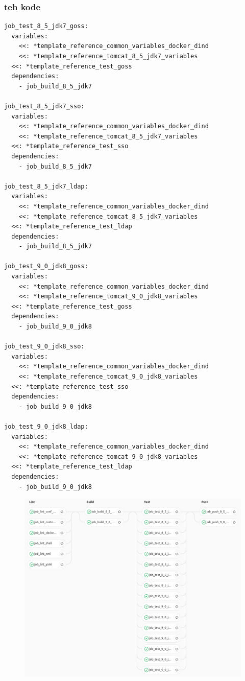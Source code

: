 \documentclass[14pt,aspectratio=169]{beamer}
\begin{document}
\begin{frame}[fragile]
  \frametitle{teh kode}
  \begin{verbatim}
job_test_8_5_jdk7_goss:
  variables:
    <<: *template_reference_common_variables_docker_dind
    <<: *template_reference_tomcat_8_5_jdk7_variables
  <<: *template_reference_test_goss
  dependencies:
    - job_build_8_5_jdk7

job_test_8_5_jdk7_sso:
  variables:
    <<: *template_reference_common_variables_docker_dind
    <<: *template_reference_tomcat_8_5_jdk7_variables
  <<: *template_reference_test_sso
  dependencies:
    - job_build_8_5_jdk7

job_test_8_5_jdk7_ldap:
  variables:
    <<: *template_reference_common_variables_docker_dind
    <<: *template_reference_tomcat_8_5_jdk7_variables
  <<: *template_reference_test_ldap
  dependencies:
    - job_build_8_5_jdk7

job_test_9_0_jdk8_goss:
  variables:
    <<: *template_reference_common_variables_docker_dind
    <<: *template_reference_tomcat_9_0_jdk8_variables
  <<: *template_reference_test_goss
  dependencies:
    - job_build_9_0_jdk8

job_test_9_0_jdk8_sso:
  variables:
    <<: *template_reference_common_variables_docker_dind
    <<: *template_reference_tomcat_9_0_jdk8_variables
  <<: *template_reference_test_sso
  dependencies:
    - job_build_9_0_jdk8

job_test_9_0_jdk8_ldap:
  variables:
    <<: *template_reference_common_variables_docker_dind
    <<: *template_reference_tomcat_9_0_jdk8_variables
  <<: *template_reference_test_ldap
  dependencies:
    - job_build_9_0_jdk8

  \end{verbatim}
\end{frame}

\begin{frame}
  \begin{figure}
    \includegraphics[height=0.9\textheight]{images/pipeline_multi.png}
  \end{figure}
\end{frame}

\section{}

\cernSplashWhite
\end{document}
